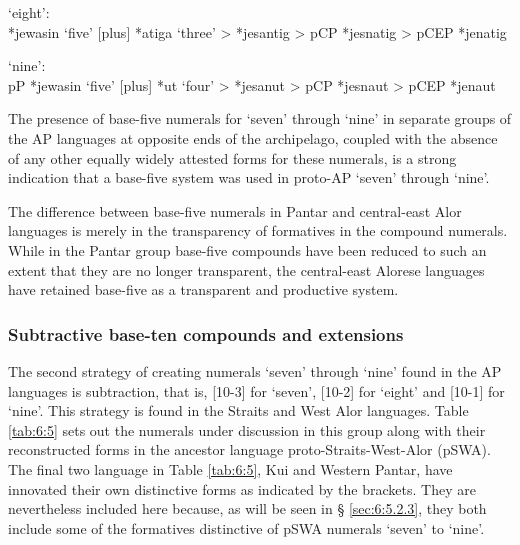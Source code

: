 \ex  `eight':\\   
*jewasin `five' [plus] *atiga `three' {\textgreater} *je{\textprimstress}santig {\textgreater} pCP *jesnatig {\textgreater} pCEP *jenatig 

\ex  `nine': \\
pP *jewasin `five' [plus] *ut `four' {\textgreater} *je{\textprimstress}sanut  {\textgreater} pCP *jesnaut {\textgreater} pCEP *jenaut 
\z
\z

The presence of base-five numerals for `seven' through `nine' in separate groups of the AP languages at opposite ends of the archipelago, coupled with the absence of any other equally widely attested forms for these numerals, is a strong indication that a base-five system was used in proto-AP `seven' through `nine'. 

The difference between base-five numerals in Pantar and central-east Alor languages is merely in the transparency of formatives in the compound numerals. While in the Pantar group base-five compounds have been reduced to such an extent that they are no longer transparent, the central-east Alorese languages have retained base-five as a transparent and productive system. 

\subsubsection{Subtractive base-ten compounds and extensions}
The second strategy of creating numerals `seven' through `nine' found in the AP languages is subtraction, that is, [10-3] for `seven', [10-2] for `eight' and  [10-1] for `nine'. This strategy is found in the Straits and West Alor languages. Table \ref{tab:6:5} sets out the numerals under discussion in this group along with their reconstructed forms in the ancestor language proto-Straits-West-Alor (pSWA). The final two language in Table \ref{tab:6:5}, Kui and Western Pantar, have innovated their own distinctive forms as indicated by the brackets. They are nevertheless included here because, as will be seen in {\S} \ref{sec:6:5.2.3}, they both include some of the formatives distinctive of pSWA numerals `seven' to `nine'.



